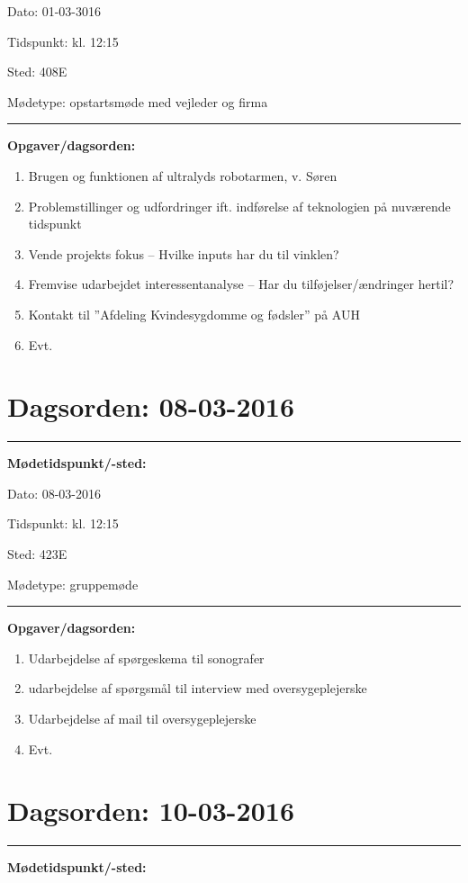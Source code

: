 Dato: \tabto{7em} 01-03-3016

Tidspunkt: \tabto{7em} kl. 12:15

Sted: \tabto{7em} 408E

Mødetype: \tabto{7em} opstartsmøde med vejleder og firma \newline


\hrule
\textbf{Opgaver/dagsorden:} \newline
\begin{enumerate}
	\item Brugen og funktionen af ultralyds robotarmen, v. Søren
	\item Problemstillinger og udfordringer ift. indførelse af teknologien på nuværende tidspunkt
	\item Vende projekts fokus – Hvilke inputs har du til vinklen?
	\item Fremvise udarbejdet interessentanalyse – Har du tilføjelser/ændringer hertil?
	\item Kontakt til ”Afdeling Kvindesygdomme og fødsler” på AUH 
	\item Evt. 
\end{enumerate}


\section{Dagsorden: 08-03-2016 }
\hrule
\textbf{Mødetidspunkt/-sted:} 

Dato: \tabto{7em} 08-03-2016

Tidspunkt: \tabto{7em} kl. 12:15

Sted: \tabto{7em} 423E

Mødetype: \tabto{7em} gruppemøde \newline


\hrule
\textbf{Opgaver/dagsorden:} \newline
\begin{enumerate}
	\item Udarbejdelse af spørgeskema til sonografer
	\item udarbejdelse af spørgsmål til  interview med oversygeplejerske
	\item Udarbejdelse af mail  til oversygeplejerske 
	\item Evt. 
\end{enumerate}


\section{Dagsorden: 10-03-2016 }
\hrule
\textbf{Mødetidspunkt/-sted:} 

